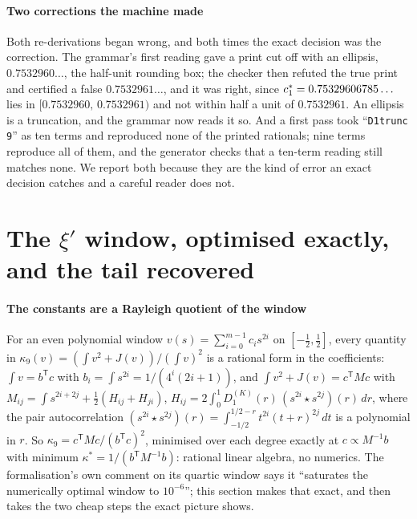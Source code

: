 \documentclass[preprint,11pt,authoryear,a4paper]{elsarticle}
\begin{document}
\paragraph{Two corrections the machine made} Both re-derivations began wrong, and both times the exact decision was the correction. The grammar's first reading gave a print cut off with an ellipsis, $0.7532960\ldots$, the half-unit rounding box; the checker then refuted the true print and certified a false $0.7532961\ldots$, and it was right, since $c_1^*=0.75329606785\ldots$ lies in $[0.7532960,\,0.7532961)$ and not within half a unit of $0.7532961$. An ellipsis is a truncation, and the grammar now reads it so. And a first pass took ``\texttt{D1trunc 9}'' as ten terms and reproduced none of the printed rationals; nine terms reproduce all of them, and the generator checks that a ten-term reading still matches none. We report both because they are the kind of error an exact decision catches and a careful reader does not.

\section{The $\xi'$ window, optimised exactly, and the tail recovered}\label{sec:window}

\paragraph{The constants are a Rayleigh quotient of the window} For an even polynomial window $v(s)=\sum_{i=0}^{m-1}c_is^{2i}$ on $[-\tfrac12,\tfrac12]$, every quantity in $\kappa_9(v)=(\int v^2+J(v))/(\int v)^2$ is a rational form in the coefficients: $\int v=b^{\mathsf T}c$ with $b_i=\int s^{2i}=1/(4^i(2i+1))$, and $\int v^2+J(v)=c^{\mathsf T}Mc$ with $M_{ij}=\int s^{2i+2j}+\tfrac12(H_{ij}+H_{ji})$, $H_{ij}=2\int_0^1D_1^{(K)}(r)\,(s^{2i}{\star}s^{2j})(r)\,dr$, where the pair autocorrelation $(s^{2i}{\star}s^{2j})(r)=\int_{-1/2}^{1/2-r}t^{2i}(t+r)^{2j}\,dt$ is a polynomial in $r$. So $\kappa_9=c^{\mathsf T}Mc/(b^{\mathsf T}c)^2$, minimised over each degree exactly at $c\propto M^{-1}b$ with minimum $\kappa^*=1/(b^{\mathsf T}M^{-1}b)$: rational linear algebra, no numerics. The formalisation's own comment on its quartic window says it ``saturates the numerically optimal window to $10^{-6}$''; this section makes that exact, and then takes the two cheap steps the exact picture shows.
\end{document}
